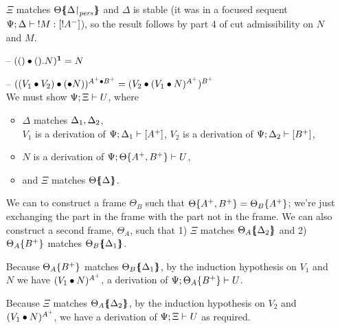 \begin{itemize}
  $\Xi$ matches ${\Theta}\mbox{$\{\hspace{-4pt}\{$}{\ensuremath{{\Delta}{\upharpoonright}_{{\it pers}}}}\mbox{$\}\hspace{-4pt}\}$}$
  and $\Delta$ is stable (it was in a focused
  sequent ${\Psi}; {\Delta} \vdash {{!}{M}} : {[{!}A^-]}$),
  so the result follows by
  part 4 of cut admissibility on $N$ and $M$. 

\smallskip

\item[--] $({()} \bullet {().{N}})^{\mathbf{1}} = N$

\item[--] $({({V_1} \mathbin{\bullet} {V_2})} \bullet {({\mathbin{\bullet}}{N}}))^{A^+ \mathbin{\bullet} B^+}
           = ({V_2} \bullet {({V_1} \bullet {N})^{A^+}})^{B^+}$ \smallskip\\
  We must show ${\Psi};{\Xi} \vdash {U} \mathstrut$, where
  \begin{itemize}
  \item $\Delta$ matches ${\Delta_1},{\Delta_2}$,\\
        $V_1$ is a derivation of ${\Psi};{\Delta_1} \vdash {[A^+]} \mathstrut$,
        $V_2$ is a derivation of ${\Psi};{\Delta_2} \vdash {[B^+]} \mathstrut$,
  \item $N$ is a derivation of 
        ${\Psi};{{\Theta}\{{A^+, B^+}\}} \vdash {U} \mathstrut$, 
  \item and $\Xi$ matches ${\Theta}\mbox{$\{\hspace{-4pt}\{$}{\Delta}\mbox{$\}\hspace{-4pt}\}$}$.
  \end{itemize}

  We can to construct a frame $\Theta_B$ such that
  ${\Theta}\{{{A^+},{B^+}}\} = {\Theta_B}\{{A^+}\}$;
  we're just exchanging
  the part in the frame with the part not in the frame. We can also 
  construct a second frame, $\Theta_A$, such that
  1) $\Xi$ matches ${\Theta_A}\mbox{$\{\hspace{-4pt}\{$}{\Delta_2}\mbox{$\}\hspace{-4pt}\}$}$ and 
  2) ${\Theta_A}\{{B^+}\}$ matches ${\Theta_B}\mbox{$\{\hspace{-4pt}\{$}{\Delta_1}\mbox{$\}\hspace{-4pt}\}$}$.


  Because ${\Theta_A}\{{B^+}\}$ matches ${\Theta_B}\mbox{$\{\hspace{-4pt}\{$}{\Delta_1}\mbox{$\}\hspace{-4pt}\}$}$,
  by the induction hypothesis on $V_1$ and $N$ we have
  $({V_1} \bullet {N})^{A^+}$, a derivation of 
  ${\Psi};{{\Theta_A}\{{B^+}\}} \vdash {U} \mathstrut$.

  Because $\Xi$ matches ${\Theta_A}\mbox{$\{\hspace{-4pt}\{$}{\Delta_2}\mbox{$\}\hspace{-4pt}\}$}$, by the induction
  hypothesis on $V_2$ and $({V_1} \bullet {N})^{A^+}$, we have a derivation
  of ${\Psi};{\Xi} \vdash {U} \mathstrut$ as required. \smallskip


\end{itemize}
